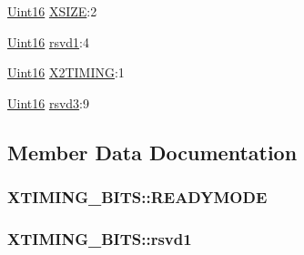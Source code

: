 \begin{DoxyCompactItemize}
\item 
\hyperlink{_d_s_p2833x___device_8h_a59a9f6be4562c327cbfb4f7e8e18f08b}{Uint16} \hyperlink{struct_x_t_i_m_i_n_g___b_i_t_s_aa1406a416e102ea67968cdd2592d6287}{X\+S\+I\+Z\+E}\+:2
\item 
\hyperlink{_d_s_p2833x___device_8h_a59a9f6be4562c327cbfb4f7e8e18f08b}{Uint16} \hyperlink{struct_x_t_i_m_i_n_g___b_i_t_s_aca715630098f6426433522297813c98d}{rsvd1}\+:4
\item 
\hyperlink{_d_s_p2833x___device_8h_a59a9f6be4562c327cbfb4f7e8e18f08b}{Uint16} \hyperlink{struct_x_t_i_m_i_n_g___b_i_t_s_a3612bf254cc007f151be5ae87b1e9aac}{X2\+T\+I\+M\+I\+N\+G}\+:1
\item 
\hyperlink{_d_s_p2833x___device_8h_a59a9f6be4562c327cbfb4f7e8e18f08b}{Uint16} \hyperlink{struct_x_t_i_m_i_n_g___b_i_t_s_a303a75ac28528211644b7e8cd5f3540b}{rsvd3}\+:9
\end{DoxyCompactItemize}


\subsection{Member Data Documentation}
\hypertarget{struct_x_t_i_m_i_n_g___b_i_t_s_a3ee07928af2eaa2b769adaa0158ed78e}{}
\subsubsection[{R\+E\+A\+D\+Y\+M\+O\+D\+E}]{ X\+T\+I\+M\+I\+N\+G\+\_\+\+B\+I\+T\+S\+::\+R\+E\+A\+D\+Y\+M\+O\+D\+E}\label{struct_x_t_i_m_i_n_g___b_i_t_s_a3ee07928af2eaa2b769adaa0158ed78e}
\hypertarget{struct_x_t_i_m_i_n_g___b_i_t_s_aca715630098f6426433522297813c98d}{}
\subsubsection[{rsvd1}]{ X\+T\+I\+M\+I\+N\+G\+\_\+\+B\+I\+T\+S\+::rsvd1}\label{struct_x_t_i_m_i_n_g___b_i_t_s_aca715630098f6426433522297813c98d}
\hypertarget{struct_x_t_i_m_i_n_g___b_i_t_s_a303a75ac28528211644b7e8cd5f3540b}{}
